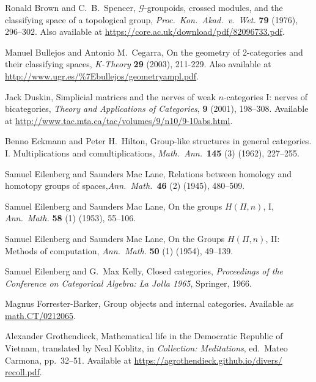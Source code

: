 \documentclass[reqno]{amsart}
\theoremstyle{definition}
\begin{document}
\begin{thebibliography}{99}
Ronald Brown and C.\ B.\ Spencer, $\mathcal{G}$-groupoids,
crossed modules, and the classifying space of a topological group,
\textsl{Proc.\ Kon.\ Akad.\ v.\ Wet.} \textbf{79} (1976), 296--302.
Also available at \href{https://core.ac.uk/download/pdf/82096733.pdf}{https://core.ac.uk/download/pdf/82096733.pdf}.

Manuel Bullejos and Antonio M.\ Cegarra,  On the geometry of 2-categories and  their classifying spaces, \textsl{K-Theory} \textbf{29} (2003), 211-229. 
Also available at \href{http://www.ugr.es/\%7Ebullejos/geometryampl.pdf}{http://www.ugr.es/\%7Ebullejos/geometryampl.pdf}.

Jack Duskin, Simplicial matrices and the nerves of weak $n$-categories I: nerves of bicategories, \textsl{Theory and Applications of Categories}, {\bf 9} (2001), 198--308.  Available at \href{http://www.tac.mta.ca/tac/volumes/9/n10/9-10abs.html}{http://www.tac.mta.ca/tac/volumes/9/n10/9-10abs.html}.

Benno Eckmann and Peter H.\ Hilton, Group-like structures in general categories. I. Multiplications and comultiplications, \textsl{Math.\ Ann.\ }\textbf{145} (3) (1962), 227--255.

Samuel Eilenberg and Saunders Mac Lane,  Relations between homology and homotopy groups of spaces,\textsl{Ann.\ Math.\ }\textbf{46} (2) (1945), 480--509.

Samuel Eilenberg and Saunders Mac Lane, On the groups $H(\Pi,n)$, I,
\textsl{Ann.\ Math. } \textbf{58} (1) (1953), 55--106.

Samuel Eilenberg and Saunders Mac Lane, On the Groups $H(\Pi,n)$, II: Methods of computation, \textsl{Ann.\ Math. } \textbf{50} (1) (1954), 49--139.

Samuel Eilenberg and G.\ Max Kelly, Closed categories, \textsl{Proceedings of the Conference on Categorical Algebra: La Jolla 1965}, Springer, 1966.

Magnus Forrester-Barker, Group objects and internal categories.  Available as \href{https://arxiv.org/abs/math.CT/0212065}{math.CT/0212065}.

Alexander Grothendieck, Mathematical life in the Democratic Republic of
Vietnam, translated by Neal Koblitz, in \textsl{Collection: Meditations}, ed.\
Mateo Carmona, pp.\ 32--51. Available at 
\href{https://agrothendieck.github.io/divers/recoll.pdf}{https://agrothendieck.github.io/divers/} \hfill \break \href{https://agrothendieck.github.io/divers/recoll.pdf}{recoll.pdf}. 


\end{thebibliography}
\end{document}
